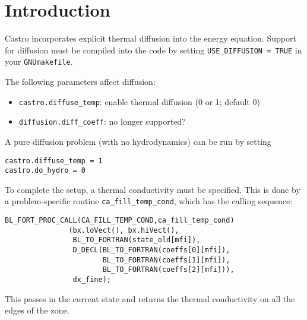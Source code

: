 \section{Introduction}

Castro incorporates explicit thermal diffusion into the energy equation.
Support for diffusion must be compiled into the code by setting
{\tt USE\_DIFFUSION = TRUE} in your {\tt GNUmakefile}.


The following parameters affect diffusion:
\begin{itemize}
\item {\tt castro.diffuse\_temp}:  enable thermal diffusion (0 or 1; default 0)

\item {\tt diffusion.diff\_coeff}: {\color{red} no longer supported?}
\end{itemize}

A pure diffusion problem (with no hydrodynamics) can be run by setting
\begin{verbatim}
castro.diffuse_temp = 1
castro.do_hydro = 0
\end{verbatim}

To complete the setup, a thermal conductivity must be specified.
This is done by a problem-specific routine {\tt ca\_fill\_temp\_cond},
which has the calling sequence:
\begin{verbatim}
BL_FORT_PROC_CALL(CA_FILL_TEMP_COND,ca_fill_temp_cond)
               (bx.loVect(), bx.hiVect(),
                BL_TO_FORTRAN(state_old[mfi]),
                D_DECL(BL_TO_FORTRAN(coeffs[0][mfi]),
                       BL_TO_FORTRAN(coeffs[1][mfi]),
                       BL_TO_FORTRAN(coeffs[2][mfi])),
                dx_fine);
\end{verbatim}
This passes in the current state and returns the thermal conductivity
on all the edges of the zone.

